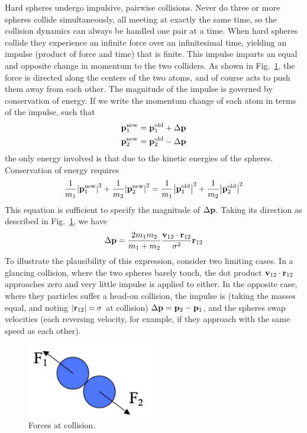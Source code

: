 \documentclass[9pt,bestpractices]{molsim}
\begin{document}
Hard spheres undergo impulsive, pairwise collisions. Never do three or
more spheres collide simultaneously, all meeting at exactly the same
time, so the collision dynamics can always be handled one pair at a
time. When hard spheres collide they experience an infinite force over
an infinitesimal time, yielding an impulse (product of force and time)
that is finite. This impulse imparts an equal and opposite change in
momentum to the two colliders. As shown in Fig.~\ref{fig:force}, the force is
directed along the centers of the two atoms, and of course acts to push
them away from each other. The magnitude of the impulse is governed by
conservation of energy. If we write the momentum change of each atom in
terms of the impulse, such that
\begin{align*}
  &{\bf{p}}_1^{\rm new} = {\bf{p}}_1^{\rm old} + \Delta {\bf{p}}\\
  &{\bf{p}}_2^{\rm new} = {\bf{p}}_2^{\rm old} - \Delta {\bf{p}}
\end{align*}
the only energy involved is that due to the kinetic energies of the
spheres. Conservation of energy requires
\[\frac{1}{{{m_1}}}{\left| {{\bf{p}}_1^{\rm new}} \right|^2} + \frac{1}{{{m_2}}}{\left| {{\bf{p}}_2^{\rm new}} \right|^2} = \frac{1}{{{m_1}}}{\left| {{\bf{p}}_1^{\rm old}} \right|^2} + \frac{1}{{{m_2}}}{\left| {{\bf{p}}_2^{\rm old}} \right|^2}\]
This equation is sufficient to specify the magnitude of $\Delta {\bf{p}}$. Taking its
direction as described in Fig.~\ref{fig:force}, we have
\[\Delta {\bf{p}} = \frac{{2{m_1}{m_2}}}{{{m_1} + {m_2}}}\frac{{{{\bf{v}}_{12}} \cdot {{\bf{r}}_{12}}}}{{{\sigma ^2}}}{{\bf{r}}_{12}}\]
To illustrate the plausibility of this expression, consider two limiting
cases. In a glancing collision, where the two spheres barely touch, the
dot product ${\bf v}_{12}\cdot{\bf r}_{12}$ approaches zero and very little impulse is applied to
either. In the opposite case, where they particles suffer a head-on
collision, the impulse is (taking the masses equal, and noting $|{\bf r}_{12}|=\sigma$ at
collision) $\Delta {\bf{p}} = {{\bf{p}}_2} - {{\bf{p}}_1}$, and the spheres swap velocities (each reversing velocity,
for example, if they approach with the same speed as each other).

\begin{figure}
  \centering
  \includegraphics[width=0.5\textwidth]{HSMD_figures/image001}
  \caption{\label{fig:force}Forces at collision.}
\end{figure}
  
\end{document}
